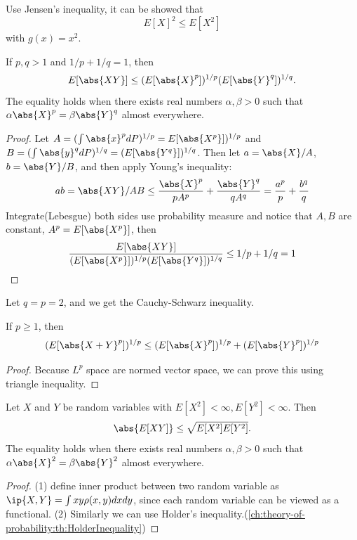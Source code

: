 \begin{refsection}
\begin{example}
	Use Jensen's inequality, it can be showed that
	$$E[X]^2 \leq E[X^2]$$ with $g(x) = x^2$.
\end{example}




\begin{theorem} 
\cite[319]{grimmett2001probability}\label{ch:theory-of-probability:th:HolderInequality}
If $p,q > 1$ and $1/p + 1/q = 1$, then
$$E[\abs{XY}] \leq (E[\abs{X}^p])^{1/p}(E[\abs{Y}^q])^{1/q}.$$
The equality holds when there exists real numbers $\alpha,\beta >0$ such that $\alpha \abs{X}^p = \beta \abs{Y}^q$  almost everywhere.
\end{theorem}
\begin{proof}
Let $A = (\int \abs{x}^pdP)^{1/p} = E[\abs{X^p}])^{1/p} $ and $B = (\int \abs{y}^qdP)^{1/q}=(E[\abs{Y^q}])^{1/q}$. Then let $a = \abs{X}/A$, $b = \abs{Y}/B$, and then apply Young's inequality:
$$ab = \abs{XY}/AB \leq \frac{\abs{X}^p}{pA^p} + \frac{\abs{Y}^q}{qA^q} = \frac{a^p}{p} + \frac{b^q}{q}$$
Integrate(Lebesgue) both sides use probability measure and notice that $A,B$ are constant, $A^p = E[\abs{X^p}]$, then
$$\frac{E[\abs{XY}]}{(E[\abs{X^p}])^{1/p}(E[\abs{Y^q}])^{1/q}} \leq 1/p+1/q =1$$	
\end{proof}

\begin{remark}
Let $q=p=2$, and we get the Cauchy-Schwarz inequality.
\end{remark}



\begin{theorem}
\cite[319]{grimmett2001probability}
If $p \geq 1$, then
$$(E[\abs{X+Y}^p])^{1/p} \leq (E[\abs{X}^p])^{1/p} + (E[\abs{Y}^p])^{1/p}$$
\end{theorem}
\begin{proof}
Because $L^p$ space are normed vector space, we can prove this using triangle inequality.	
\end{proof}

\begin{theorem}\cite{rosenthal2006first}\cite[187]{casella2002statistical}\label{ch:theory-of-probability:th:Cauchy-SchwarzInequality}
	Let $X$ and $Y$ be random variables with $E[X^2] < \infty, E[Y^2]<\infty$. Then $$\abs{E[XY]}\leq \sqrt{E[X^2]E[Y^2]}.$$
	The equality holds when there exists real numbers $\alpha,\beta >0$ such that $\alpha \abs{X}^2 = \beta \abs{Y}^2$ almost everywhere.
\end{theorem}
\begin{proof}
(1)	define inner product between two random variable as $\ip{X,Y} = \int xy\rho(x,y)dxdy$, since each random variable can be viewed as a functional. 
(2) Similarly we can use Holder's inequality.(\autoref{ch:theory-of-probability:th:HolderInequality})
\end{proof}


\end{refsection}
